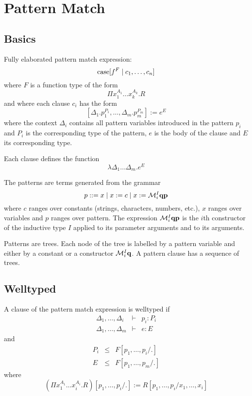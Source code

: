 \section{Pattern Match}


\subsection{Basics}

Fully elaborated pattern match expression:
$$
{\text{case}}[ f^F \mid c_1,  \ldots, c_n]
$$
%
where $F$ is a function type of the form
%
$$
\Pi x_1^{A_1} \ldots x_k^{A_k}. R
$$
%
and where each clause $c_i$ has the form
%
$$
    [\Delta_1. p_1^{P_1}, \ldots, \Delta_m. p_m^{P_m}] := e^E
$$
where the context $\Delta_i$ contains all pattern variables introduced in the
pattern $p_i$
and $P_i$ is the corresponding type of the pattern, $e$ is the body of the
clause and $E$ its corresponding type.

Each clause defines the function
$$
\lambda \Delta_1 \ldots \Delta_m. e^E
$$


The patterns are terms generated from the grammar
$$
    p ::= x \mid x := c \mid x := {\cal M}^I_i {\mathbf q} {\mathbf p}
$$
where $c$ ranges over constants (strings, characters, numbers, etc.), $x$ ranges
over variables and $p$ ranges over pattern. The expression ${\cal M}^I_i {\mathbf q}
{\mathbf p}$ is the $i$th constructor of the inductive type $I$ applied to its
parameter arguments and to its arguments.

Patterns are trees. Each node of the tree is labelled by a pattern variable and
either by a constant or a constructor ${\cal M}^I_i {\mathbf q}$. A pattern clause has a
sequence of trees.



\subsection{Welltyped}

A clause of the pattern match expression is welltyped if
$$
\begin{array}{lll}
    \Delta_1,\ldots,\Delta_i &\vdash& p_i : P_i
    \\
    \Delta_1,\ldots,\Delta_m &\vdash& e : E
\end{array}
$$
%
and
%
$$
\begin{array}{lll}
    P_i &\le& F[p_1,\ldots,p_i / .]
    \\
    E   &\le& F[p_1,\ldots,p_m / .]
\end{array}
$$
%
where
%
$$
    (\Pi x_1^{A_1} \ldots x_i^{A_i} . R)[p_1,\ldots,p_i/.]
    :=
    R[p_1,\ldots,p_i / x_1,\ldots,x_i]
$$




